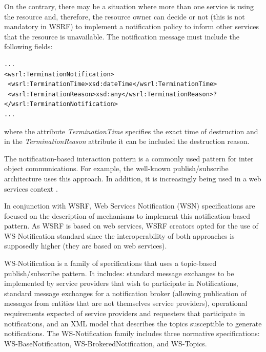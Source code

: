On the contrary, there may be a situation where more than one service 
is using the resource and, therefore, the resource owner can decide or not 
(this is not mandatory in WSRF) to implement a notification policy
to inform other services that the resource is unavailable. The notification message must include the following fields: 

\lstset{language=XML, numbersep=5pt, frame=single}
\begin{lstlisting}
...
<wsrl:TerminationNotification>
 <wsrl:TerminationTime>xsd:dateTime</wsrl:TerminationTime>
 <wsrl:TerminationReason>xsd:any</wsrl:TerminationReason>?
</wsrl:TerminationNotification>
...
\end{lstlisting}
where the attribute \emph{TerminationTime} specifies the exact time of destruction
and in the \emph{TerminationReason} attribute it can be included the destruction reason.

The notification-based interaction pattern is a commonly used pattern
for inter object communications. For example, the well-known
publish/subscribe architecture uses this approach. In addition, it is increasingly being
used in a web services context \cite{}.

In conjunction with WSRF, Web Services Notification (WSN) specifications are focused 
on the description of mechanisms to implement this notification-based pattern. 
As WSRF is based on web services, WSRF creators opted for the use
of WS-Notification standard since the interoperability of both approaches is supposedly higher (they
 are based on web services). 

WS-Notification is a family of specifications that uses a topic-based publish/subscribe
pattern. It includes: standard message exchanges to be implemented by service
providers that wish to participate in Notifications, standard message exchanges for a
notification broker (allowing publication of messages from entities that
are not themselves service providers), operational requirements expected of service providers 
and requesters that participate in notifications, and an XML model that
describes the topics susceptible to generate notifications. The WS-Notification family includes
three normative specifications:
WS-BaseNotification, WS-BrokeredNotification, and WS-Topics.

